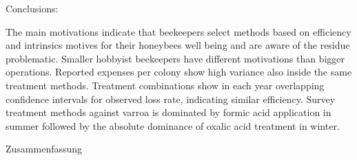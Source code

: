 Conclusions:

The main motivations indicate that beekeepers select methods based on efficiency and intrinsics motives for their honeybees well being and are aware of the residue problematic. Smaller hobbyist beekeepers have different motivations than bigger operations. Reported expenses per colony show high variance also inside the same treatment methods. Treatment combinations show in each year overlapping confidence intervals for observed loss rate, indicating similar efficiency. Survey treatment methods against varroa is dominated by formic acid application in summer followed by the absolute dominance of oxalic acid treatment in winter.

\vspace*{20mm}

{Zusammenfassung}
\label{sec:Zusammenfassung}